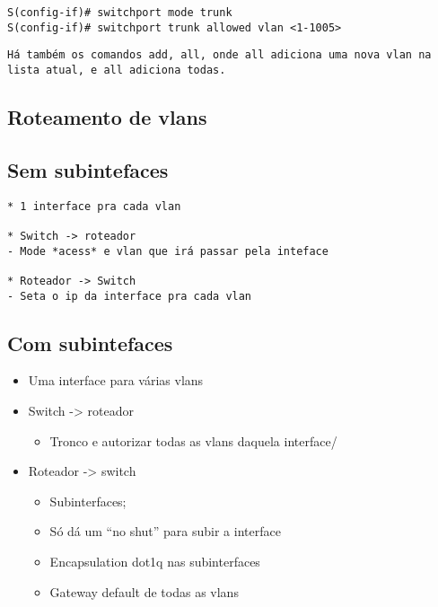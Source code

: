 \documentclass[]{article}
\begin{document}
\begin{verbatim}
S(config-if)# switchport mode trunk
S(config-if)# switchport trunk allowed vlan <1-1005>
\end{verbatim}

\begin{verbatim}
Há também os comandos add, all, onde all adiciona uma nova vlan na lista atual, e all adiciona todas.
\end{verbatim}

\subsection{Roteamento de vlans}\label{roteamento-de-vlans}

\subsection{Sem subintefaces}\label{sem-subintefaces}

\begin{verbatim}
* 1 interface pra cada vlan

* Switch -> roteador
- Mode *acess* e vlan que irá passar pela inteface 

* Roteador -> Switch
- Seta o ip da interface pra cada vlan
\end{verbatim}

\subsection{Com subintefaces}\label{com-subintefaces}

\begin{itemize}
\item
  Uma interface para várias vlans
\item
  Switch -\textgreater{} roteador

  \begin{itemize}
  \itemsep1pt\parskip0pt
  \item
    Tronco e autorizar todas as vlans daquela interface/
  \end{itemize}
\item
  Roteador -\textgreater{} switch

  \begin{itemize}
  \item
    Subinterfaces;
  \item
    Só dá um ``no shut'' para subir a interface
  \item
    Encapsulation dot1q nas subinterfaces
  \item
    Gateway default de todas as vlans
  \end{itemize}
\end{itemize}
\end{document}
